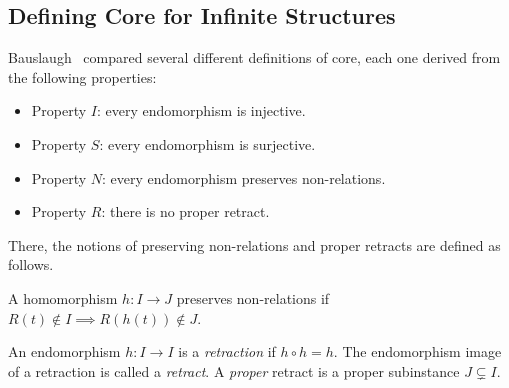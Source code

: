 \documentclass[acmsmall,screen,nonacm,review]{acmart}
\begin{document}
\subsection{Defining Core for Infinite Structures}\label{sec:related-core}
Bauslaugh~\cite{DBLP:journals/dm/Bauslaugh95} compared several different 
 definitions of core, each one derived from the following properties:
%
\begin{itemize}
    \item Property $I$: every endomorphism is injective.
    \item Property $S$: every endomorphism is surjective.
    \item Property $N$: every endomorphism preserves non-relations.
    \item Property $R$: there is no proper retract.
\end{itemize}
%
There, the notions of preserving non-relations and proper retracts
 are defined as follows.
% 
\begin{definition}
    A homomorphism $h: I \rightarrow J$ preserves 
    non-relations if $R(t) \notin I \implies R(h(t)) \notin J$.
\end{definition}
% 
\begin{definition}
    An endomorphism $h: I \rightarrow I$ is a {\em retraction} if 
    $h \circ h = h$. The endomorphism image of a retraction is called a {\em retract}.
    A {\em proper} retract is a proper subinstance $J \subsetneq I$.
\end{definition}
% 
\end{document}
